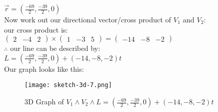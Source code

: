 $\vec{r} = (\frac{-69}{2},\frac{-39}{2},0)$ \\ 

Now work out our directional vector/cross product of $V_1$ and $V_2$: \\

our cross product is: \\

$\begin{pmatrix}2&-4&2\end{pmatrix}\times \begin{pmatrix}1&-3&5\end{pmatrix}=\begin{pmatrix}-14&-8&-2\end{pmatrix}$ \\

$\therefore$ our line can be described by: \\

$L =  (\frac{-69}{2},\frac{-39}{2},0)+(-14,-8,-2)t$  \\

Our graph looks like this: \\

\begin{figure}[H]
\centering
\texttt{[image: sketch-3d-7.png]}
\caption{3D Graph of  $V_1 \land V_2 \land L = (\frac{-69}{2},\frac{-39}{2},0)+(-14,-8,-2)t$}
\label{fig:Plane_3D_worked_7}
\end{figure}